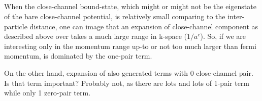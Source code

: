 \subsection{}\label{sec:20100823}
When the close-channel bound-state, which might or might not be the eigenstate of the bare close-channel potential, is relatively small comparing to the inter-particle distance, one can image that an expansion of close-channel component as described above over  takes a much large range in k-space ($1/a^{c}$).   So, if we are interesting only in the momentum range up-to or not too much larger than fermi momentum,  is dominated by the one-pair term.  

On the other hand, expansion of  also generated terms with 0 close-channel pair.  Is that term important? Probably not, as there are lots and lots of 1-pair term while only 1 zero-pair term.  